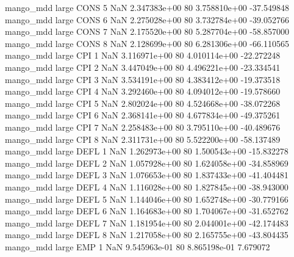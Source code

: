         mango_mdd      large     CONS                 5                  NaN 2.347383e+00 80   3.758810e+00         -37.549848
        mango_mdd      large     CONS                 6                  NaN 2.275028e+00 80   3.732784e+00         -39.052766
        mango_mdd      large     CONS                 7                  NaN 2.175520e+00 80   5.287704e+00         -58.857000
        mango_mdd      large     CONS                 8                  NaN 2.128699e+00 80   6.281306e+00         -66.110565
        mango_mdd      large      CPI                 1                  NaN 3.116971e+00 80   4.010114e+00         -22.272248
        mango_mdd      large      CPI                 2                  NaN 3.447049e+00 80   4.496221e+00         -23.334541
        mango_mdd      large      CPI                 3                  NaN 3.534191e+00 80   4.383412e+00         -19.373518
        mango_mdd      large      CPI                 4                  NaN 3.292460e+00 80   4.094012e+00         -19.578660
        mango_mdd      large      CPI                 5                  NaN 2.802024e+00 80   4.524668e+00         -38.072268
        mango_mdd      large      CPI                 6                  NaN 2.368141e+00 80   4.677834e+00         -49.375261
        mango_mdd      large      CPI                 7                  NaN 2.258483e+00 80   3.795110e+00         -40.489676
        mango_mdd      large      CPI                 8                  NaN 2.311731e+00 80   5.522200e+00         -58.137489
        mango_mdd      large     DEFL                 1                  NaN 1.262973e+00 80   1.500543e+00         -15.832278
        mango_mdd      large     DEFL                 2                  NaN 1.057928e+00 80   1.624058e+00         -34.858969
        mango_mdd      large     DEFL                 3                  NaN 1.076653e+00 80   1.837433e+00         -41.404481
        mango_mdd      large     DEFL                 4                  NaN 1.116028e+00 80   1.827845e+00         -38.943000
        mango_mdd      large     DEFL                 5                  NaN 1.144046e+00 80   1.652748e+00         -30.779166
        mango_mdd      large     DEFL                 6                  NaN 1.164683e+00 80   1.704067e+00         -31.652762
        mango_mdd      large     DEFL                 7                  NaN 1.181954e+00 80   2.044001e+00         -42.174483
        mango_mdd      large     DEFL                 8                  NaN 1.217058e+00 80   2.165755e+00         -43.804435
        mango_mdd      large      EMP                 1                  NaN 9.545963e-01 80   8.865198e-01           7.679072
